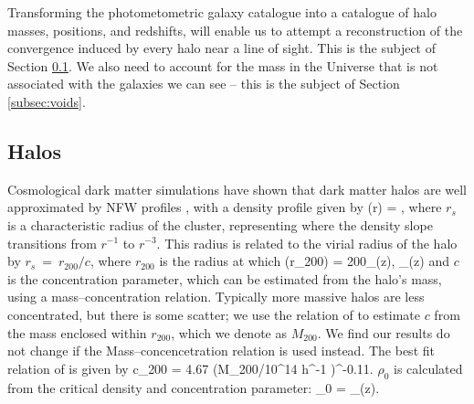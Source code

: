 \documentclass[useAMS,usenatbib]{mn2e}
\begin{document}
Transforming the photometometric galaxy catalogue into a  catalogue of
halo masses, positions, and redshifts, will enable us to attempt a
reconstruction of the convergence induced by every halo near a line of sight.
This is the subject of Section \ref{subsec:halos}. We also need to account for
the mass in the Universe that is not associated with the galaxies we can see
-- this is the subject of Section \ref{subsec:voids}. 

\subsection{Halos}
\label{subsec:halos}

Cosmological dark matter simulations have shown that dark matter
halos are well approximated by NFW profiles \citep{NFW}, with a density
profile given by
\be\label{eq:rhonfw}
\rho(r) = 
,
\ee
where $r_{s}$ is a characteristic radius of the cluster, representing where
the density slope transitions from $r^{-1}$ to $r^{-3}$. This radius is related
to the virial radius of the halo by $r_{s}~=~r_{200}/c$, where $r_{200}$ is the radius at 
which 
\be
\rho(r_{200}) = 200\rho_{{}}(z),  \rho_{}(z) \equiv {}
\ee
and $c$ is the concentration parameter, which can be estimated from the halo's mass,
using a mass--concentration relation. Typically more massive halos are less concentrated,
but there is some scatter; we use the relation of \citet{Neto2007} to estimate $c$
from the mass enclosed within $r_{200}$, which we denote as $M_{200}$. We find our results do not change if the \citet{Macchio} Mass--concencetration relation is used instead. The best fit relation of \citet{Neto2007} is given by
\be
c_{200} = 4.67 (M_{200}/10^{14} h^{-1} \Msun)^{-0.11}.
\ee
$\rho_0$ is calculated from the critical density and concentration parameter:
\be
\rho_0 = \rho_{}(z).
\ee
\end{document}
